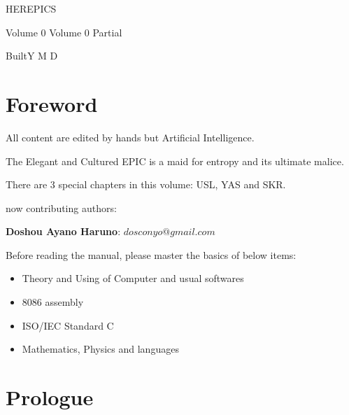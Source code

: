 \begin{sloppypar}
\author{dosconio}
{
\begin{center}
	{
	\fontsize{48pt}{0}\selectfont\textcolor[rgb]{1, 0, 0.618}{HEREPICS}}
\end{center}
}
\ifdetail{}
{\hfill\sc\fontsize{24pt}{0}\selectfont\textcolor[rgb]{1, 0, 0.618}{Volume 0}}
\else
{\hfill\sc\fontsize{24pt}{0}\selectfont\textcolor[rgb]{1, 0, 0.618}{Volume 0} Partial}
\fi

{\hfill\sc\fontsize{24pt}{0}\selectfont\textcolor[rgb]{1, 0, 0.618}{BuiltY\number\year{} M\number\month{} D\number\day{}}}

\newpage %
\renewcommand{\contentsname}{Contents}
\tableofcontents

\section{Foreword} %

All content\cite{HEREPIC} are edited by hands but Artificial Intelligence.

The Elegant and Cultured EPIC is a maid for entropy and its ultimate malice.

There are 3 special chapters in this volume: USL, YAS and SKR.

now contributing authors:

\textbf{Doshou Ayano Haruno}: 
$dosconyo@gmail.com$

Before reading the manual, please master the basics of below items:
\begin{itemize}
	\item Theory and Using of Computer and usual softwares 
	\item 8086 assembly
	\item ISO/IEC Standard C
	\item Mathematics, Physics and languages
\end{itemize}

\section{Prologue} %



\end{sloppypar}
